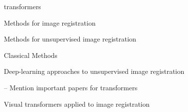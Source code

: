 transformers

Methods for image registration


Methods for unsupervised image registration


Classical Methods

Deep-learning approaches to unsupervised image registration


-- Mention important papers for transformers


Visual transformers applied to image registration


